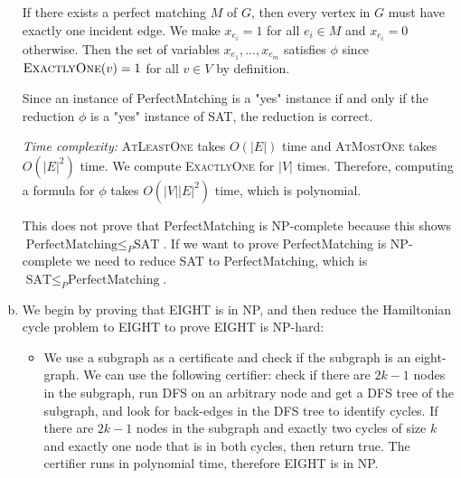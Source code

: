 \documentclass[11pt]{article}
\begin{document}
\begin{solution}
\begin{enumerate}[(a)]
If there exists a perfect matching $M$ of $G$, then every vertex in $G$ must have exactly one incident edge. We make $x_{e_i}=1$ for all $e_i\in M$ and $x_{e_i}=0$ otherwise. Then the set of variables $x_{e_1},...,x_{e_m}$ satisfies $\phi$ since $\textsc{ExactlyOne}(v)=1$ for all $v\in V$ by definition.

Since an instance of PerfectMatching is a "yes" instance if and only if the reduction $\phi$ is a "yes" instance of SAT, the reduction is correct.

\emph{Time complexity:} \textsc{AtLeastOne} takes $O(|E|)$ time and \textsc{AtMostOne} takes $O(|E|^2)$ time. We compute \textsc{ExactlyOne} for $|V|$ times. Therefore, computing a formula for $\phi$ takes $O(|V||E|^2)$ time, which is polynomial.

This does not prove that PerfectMatching is NP-complete because this shows $\text{PerfectMatching} \le_{P} \text{SAT}$. If we want to prove PerfectMatching is NP-complete we need to reduce SAT to PerfectMatching, which is $\text{SAT} \le_{P} \text{PerfectMatching}$.

\item We begin by proving that EIGHT is in NP, and then reduce the Hamiltonian cycle problem to EIGHT to prove EIGHT is NP-hard:
\begin{itemize}
\item We use a subgraph as a certificate and check if the subgraph is an eight-graph. We can use the following certifier: check if there are $2k-1$ nodes in the subgraph, run DFS on an arbitrary node and get a DFS tree of the subgraph, and look for back-edges in the DFS tree to identify cycles. If there are $2k-1$ nodes in the subgraph and exactly two cycles of size $k$ and exactly one node that is in both cycles, then return true. The certifier runs in polynomial time, therefore EIGHT is in NP.


\end{itemize}
\end{enumerate}
\end{solution}
\end{document}

